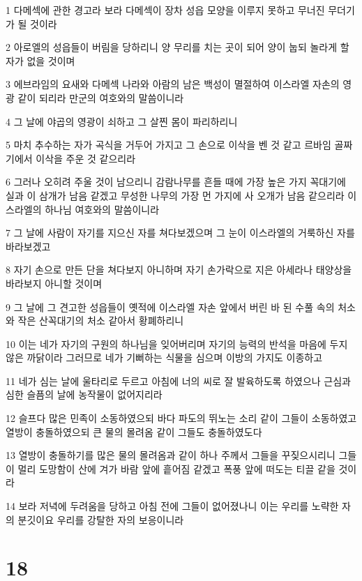 \par 1 다메섹에 관한 경고라 보라 다메섹이 장차 성읍 모양을 이루지 못하고 무너진 무더기가 될 것이라
\par 2 아로엘의 성읍들이 버림을 당하리니 양 무리를 치는 곳이 되어 양이 눕되 놀라게 할 자가 없을 것이며
\par 3 에브라임의 요새와 다메섹 나라와 아람의 남은 백성이 멸절하여 이스라엘 자손의 영광 같이 되리라 만군의 여호와의 말씀이니라
\par 4 그 날에 야곱의 영광이 쇠하고 그 살찐 몸이 파리하리니
\par 5 마치 추수하는 자가 곡식을 거두어 가지고 그 손으로 이삭을 벤 것 같고 르바임 골짜기에서 이삭을 주운 것 같으리라
\par 6 그러나 오히려 주울 것이 남으리니 감람나무를 흔들 때에 가장 높은 가지 꼭대기에 실과 이 삼개가 남음 같겠고 무성한 나무의 가장 먼 가지에 사 오개가 남음 같으리라 이스라엘의 하나님 여호와의 말씀이니라
\par 7 그 날에 사람이 자기를 지으신 자를 쳐다보겠으며 그 눈이 이스라엘의 거룩하신 자를 바라보겠고
\par 8 자기 손으로 만든 단을 쳐다보지 아니하며 자기 손가락으로 지은 아세라나 태양상을 바라보지 아니할 것이며
\par 9 그 날에 그 견고한 성읍들이 옛적에 이스라엘 자손 앞에서 버린 바 된 수풀 속의 처소와 작은 산꼭대기의 처소 같아서 황폐하리니
\par 10 이는 네가 자기의 구원의 하나님을 잊어버리며 자기의 능력의 반석을 마음에 두지 않은 까닭이라 그러므로 네가 기뻐하는 식물을 심으며 이방의 가지도 이종하고
\par 11 네가 심는 날에 울타리로 두르고 아침에 너의 씨로 잘 발육하도록 하였으나 근심과 심한 슬픔의 날에 농작물이 없어지리라
\par 12 슬프다 많은 민족이 소동하였으되 바다 파도의 뛰노는 소리 같이 그들이 소동하였고 열방이 충돌하였으되 큰 물의 몰려옴 같이 그들도 충돌하였도다
\par 13 열방이 충돌하기를 많은 물의 몰려옴과 같이 하나 주께서 그들을 꾸짖으시리니 그들이 멀리 도망함이 산에 겨가 바람 앞에 흩어짐 같겠고 폭풍 앞에 떠도는 티끌 같을 것이라
\par 14 보라 저녁에 두려움을 당하고 아침 전에 그들이 없어졌나니 이는 우리를 노략한 자의 분깃이요 우리를 강탈한 자의 보응이니라

\chapter{18}

